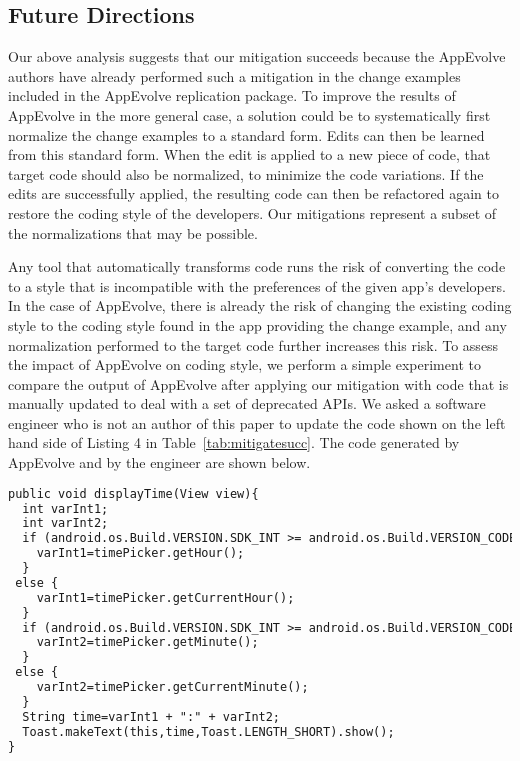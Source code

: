 \subsection{Future Directions}

Our above analysis suggests that our mitigation succeeds because the
AppEvolve authors have already performed such a mitigation in the change
examples included in the AppEvolve replication package.  To improve the
results of AppEvolve in the more general case, a solution could be to
systematically first normalize the change examples to a standard form.
Edits can then be learned from this standard form. When the edit is applied
to a new piece of code, that target code should also be normalized, to
minimize the code variations. If the edits are successfully applied, the
resulting code can then be refactored again to restore the coding style of
the developers.  Our mitigations represent a subset of the normalizations
that may be possible.

Any tool that automatically transforms code runs the risk of converting the
code to a style that is incompatible with the preferences of the given
app's developers.  In the case of AppEvolve, there is already the risk of
changing the existing coding style to the coding style found in the app
providing the change example, and any normalization performed to the target
code further increases this risk.  To assess the impact of AppEvolve on
coding style, we perform a simple experiment to compare the output of
AppEvolve after applying our mitigation with code that is manually updated
to deal with a set of deprecated APIs.  We asked a software engineer who is
not an author of this paper to update the code shown on the left hand side
of Listing 4 in Table~\ref{tab:mitigatesucc}. The code generated by
AppEvolve and by the engineer are shown below.


\vspace{0.2cm}
\vspace{0.5cm}\begin{lstlisting}[language=diff,numbers=none]
public void displayTime(View view){
  int varInt1;
  int varInt2;
  if (android.os.Build.VERSION.SDK_INT >= android.os.Build.VERSION_CODES.M) {
    varInt1=timePicker.getHour();
  }
 else {
    varInt1=timePicker.getCurrentHour();
  }
  if (android.os.Build.VERSION.SDK_INT >= android.os.Build.VERSION_CODES.M) {
    varInt2=timePicker.getMinute();
  }
 else {
    varInt2=timePicker.getCurrentMinute();
  }
  String time=varInt1 + ":" + varInt2;
  Toast.makeText(this,time,Toast.LENGTH_SHORT).show();
}
\end{lstlisting}


